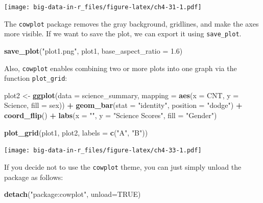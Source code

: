 \documentclass[]{book}
\newenvironment{Shaded}{\begin{snugshade}}{\end{snugshade}}
\newcommand{\DataTypeTok}[1]{\textcolor[rgb]{0.13,0.29,0.53}{#1}}
\newcommand{\FloatTok}[1]{\textcolor[rgb]{0.00,0.00,0.81}{#1}}
\newcommand{\KeywordTok}[1]{\textcolor[rgb]{0.13,0.29,0.53}{\textbf{#1}}}
\newcommand{\NormalTok}[1]{#1}
\newcommand{\OperatorTok}[1]{\textcolor[rgb]{0.81,0.36,0.00}{\textbf{#1}}}
\newcommand{\OtherTok}[1]{\textcolor[rgb]{0.56,0.35,0.01}{#1}}
\newcommand{\StringTok}[1]{\textcolor[rgb]{0.31,0.60,0.02}{#1}}
\begin{document}
\texttt{[image: big-data-in-r\_files/figure-latex/ch4-31-1.pdf]}

The \texttt{cowplot} package removes the gray background, gridlines, and make the axes more visible. If we want to save the plot, we can export it using \texttt{save\_plot}.

\begin{Shaded}
\begin{Highlighting}[]
\KeywordTok{save_plot}\NormalTok{(}\StringTok{"plot1.png"}\NormalTok{, plot1,}
          \DataTypeTok{base_aspect_ratio =} \FloatTok{1.6}\NormalTok{)}
\end{Highlighting}
\end{Shaded}

Also, \texttt{cowplot} enables combining two or more plots into one graph via the function \texttt{plot\_grid}:

\begin{Shaded}
\begin{Highlighting}[]
\NormalTok{plot2 <-}\StringTok{ }
\StringTok{  }\KeywordTok{ggplot}\NormalTok{(}\DataTypeTok{data =}\NormalTok{ science_summary,}
         \DataTypeTok{mapping =} \KeywordTok{aes}\NormalTok{(}\DataTypeTok{x =}\NormalTok{ CNT, }\DataTypeTok{y =}\NormalTok{ Science, }\DataTypeTok{fill =}\NormalTok{ sex)) }\OperatorTok{+}
\StringTok{  }\KeywordTok{geom_bar}\NormalTok{(}\DataTypeTok{stat =} \StringTok{"identity"}\NormalTok{, }\DataTypeTok{position =} \StringTok{"dodge"}\NormalTok{) }\OperatorTok{+}
\StringTok{  }\KeywordTok{coord_flip}\NormalTok{() }\OperatorTok{+}
\StringTok{  }\KeywordTok{labs}\NormalTok{(}\DataTypeTok{x =} \StringTok{""}\NormalTok{, }\DataTypeTok{y =} \StringTok{"Science Scores"}\NormalTok{, }\DataTypeTok{fill =} \StringTok{"Gender"}\NormalTok{) }


\KeywordTok{plot_grid}\NormalTok{(plot1, plot2, }\DataTypeTok{labels =} \KeywordTok{c}\NormalTok{(}\StringTok{"A"}\NormalTok{, }\StringTok{"B"}\NormalTok{))}
\end{Highlighting}
\end{Shaded}

\texttt{[image: big-data-in-r\_files/figure-latex/ch4-33-1.pdf]}

If you decide not to use the \texttt{cowplot} theme, you can just simply unload the package as follows:

\begin{Shaded}
\begin{Highlighting}[]
\KeywordTok{detach}\NormalTok{(}\StringTok{"package:cowplot"}\NormalTok{, }\DataTypeTok{unload=}\OtherTok{TRUE}\NormalTok{)}
\end{Highlighting}
\end{Shaded}
\end{document}
